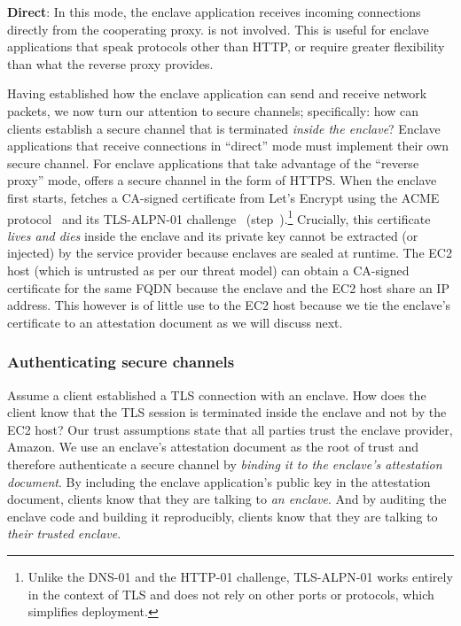 {\bf Direct}: In this mode, the enclave application receives incoming
connections directly from the cooperating proxy.  \Tool{} is not involved.  This
is useful for enclave applications that speak protocols other than HTTP, or
require greater flexibility than what the reverse proxy provides.

Having established how the enclave application can send and receive network
packets, we now turn our attention to secure channels; specifically: how can
clients establish a secure channel that is terminated \emph{inside the enclave}?
Enclave applications that receive connections in ``direct'' mode must implement
their own secure channel.   For enclave applications that take advantage of the
``reverse proxy'' mode, \tool{} offers a secure channel in the form of HTTPS.
When the enclave first starts, \tool{} fetches a CA-signed certificate from
Let's Encrypt using the ACME protocol~\cite{acme-protocol} and its TLS-ALPN-01
challenge~\cite{tls-alpn} (step~).\footnote{Unlike the DNS-01 and the
HTTP-01 challenge, TLS-ALPN-01 works entirely in the context of TLS and does not
rely on other ports or protocols, which simplifies deployment.}  Crucially, this
certificate \emph{lives and dies} inside the enclave and its private key cannot
be extracted (or injected) by the service provider because enclaves are sealed
at runtime.
%
The EC2 host (which is untrusted as per our threat model) can obtain a
CA-signed certificate for the same FQDN because the enclave and the EC2 host
share an IP address.  This however is of little use to the EC2 host because we
tie the enclave's certificate to an attestation document as we will discuss
next.

\subsubsection{Authenticating secure channels}%
\label{sec:attestation}

Assume a client established a TLS connection with an enclave.  How does the
client know that the TLS session is terminated inside the enclave and not by
the EC2 host?  Our trust assumptions state that all parties trust the enclave
provider, Amazon.  We use an enclave's attestation document as the root
of trust and therefore authenticate a secure channel by \emph{binding it to the
enclave's attestation document}.  By including the enclave application's public
key in the attestation document, clients know that they are talking to \emph{an
enclave}.  And by auditing the enclave code and building it reproducibly,
clients know that they are talking to \emph{their trusted enclave}.

